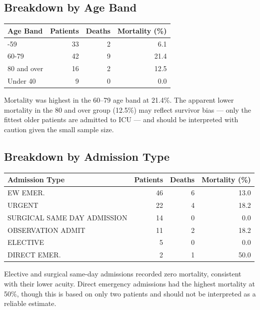 \documentclass[
]{article}
\newcounter{none} %
\begin{document}
\subsection{Breakdown by Age Band}\label{breakdown-by-age-band}

{\def\LTcaptype{none} %
\begin{longtable}[]{@{}lrrr@{}}
\toprule\noalign{}
Age Band & Patients & Deaths & Mortality (\%) \\
\midrule\noalign{}
\endhead
\bottomrule\noalign{}
\endlastfoot
40-59 & 33 & 2 & 6.1 \\
60-79 & 42 & 9 & 21.4 \\
80 and over & 16 & 2 & 12.5 \\
Under 40 & 9 & 0 & 0.0 \\
\end{longtable}
}

Mortality was highest in the 60--79 age band at 21.4\%. The apparent
lower mortality in the 80 and over group (12.5\%) may reflect survivor
bias --- only the fittest older patients are admitted to ICU --- and
should be interpreted with caution given the small sample size.

\subsection{Breakdown by Admission
Type}\label{breakdown-by-admission-type}

{\def\LTcaptype{none} %
\begin{longtable}[]{@{}lrrr@{}}
\toprule\noalign{}
Admission Type & Patients & Deaths & Mortality (\%) \\
\midrule\noalign{}
\endhead
\bottomrule\noalign{}
\endlastfoot
EW EMER. & 46 & 6 & 13.0 \\
URGENT & 22 & 4 & 18.2 \\
SURGICAL SAME DAY ADMISSION & 14 & 0 & 0.0 \\
OBSERVATION ADMIT & 11 & 2 & 18.2 \\
ELECTIVE & 5 & 0 & 0.0 \\
DIRECT EMER. & 2 & 1 & 50.0 \\
\end{longtable}
}

Elective and surgical same-day admissions recorded zero mortality,
consistent with their lower acuity. Direct emergency admissions had the
highest mortality at 50\%, though this is based on only two patients and
should not be interpreted as a reliable estimate.
\end{document}
